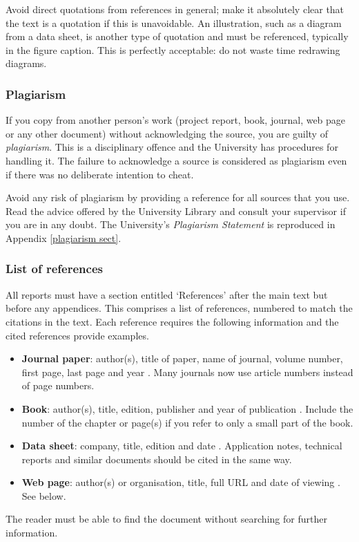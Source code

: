 Avoid direct quotations from references in general; make it absolutely clear that the text is a quotation if this is unavoidable. An illustration, such as a diagram from a data sheet, is another type of quotation and must be referenced, typically in the figure caption. This is perfectly acceptable: do not waste time redrawing diagrams.

\subsubsection{Plagiarism}

If you copy from another person's work (project report, book, journal, web page or any other document) without acknowledging the source, you are guilty of \emph{plagiarism}. This is a disciplinary offence and the University has procedures for handling it. The failure to acknowledge a source is considered as plagiarism even if there was no deliberate intention to cheat. 

Avoid any risk of plagiarism by providing a reference for all sources that you use. Read the advice offered by the University Library and consult your supervisor if you are in any doubt. The University's \emph{Plagiarism Statement} is reproduced in Appendix \ref{plagiarism sect}.

\subsubsection{List of references}

All reports must have a section entitled `References' after the main text but before any appendices. This comprises a list of references, numbered to match the citations in the text. Each reference requires the following information and the cited references provide examples.
\begin{itemize}
\item
\textbf{Journal paper}: 
author(s), title of paper, name of journal, volume number, first page, last page and year \cite{gmf87}. 
Many journals now use article numbers instead of page numbers.
\item
\textbf{Book}: 
author(s), title, edition, publisher and year of publication \cite{jve05}.
Include the number of the chapter or page(s) if you refer to only a small part of the book.
\item
\textbf{Data sheet}: 
company, title, edition and date \cite{s08qg}. 
Application notes, technical reports and similar documents should be cited in the same way.
\item
\textbf{Web page}: 
author(s) or organisation, title, full URL and date of viewing \cite{mac09}. See below.
\end{itemize}
The reader must be able to find the document without searching for further information.

